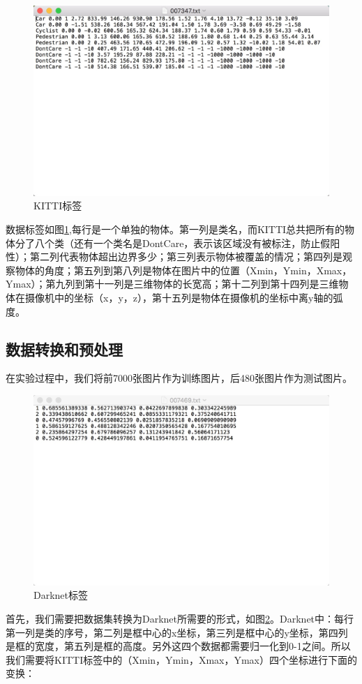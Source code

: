 {	\begin{figure}[htbp]
	\centering
	\includegraphics[width=5in]{images/KITTILable.png}
	\caption{KITTI标签}
	\label{KITTILable}
	\end{figure}
	数据标签如图\ref{KITTILable},每行是一个单独的物体。第一列是类名，而KITTI总共把所有的物体分了八个类（还有一个类名是DontCare，表示该区域没有被标注，防止假阳性）；第二列代表物体超出边界多少；第三列表示物体被覆盖的情况；第四列是观察物体的角度；第五列到第八列是物体在图片中的位置（Xmin，Ymin，Xmax，Ymax）；第九列到第十一列是三维物体的长宽高；第十二列到第十四列是三维物体在摄像机中的坐标（x，y，z），第十五列是物体在摄像机的坐标中离y轴的弧度。

	\subsection{数据转换和预处理}
	在实验过程中，我们将前7000张图片作为训练图片，后480张图片作为测试图片。

	\begin{figure}[htbp]
	\centering
	\includegraphics[width=5in]{images/darknetLabel.png}
	\caption{Darknet标签}
	\label{darknetLabel}
	\end{figure}
	首先，我们需要把数据集转换为Darknet所需要的形式，如图\ref{darknetLabel}。Darknet中：每行第一列是类的序号，第二列是框中心的x坐标，第三列是框中心的y坐标，第四列是框的宽度，第五列是框的高度。另外这四个数据都需要归一化到0-1之间。所以我们需要将KITTI标签中的（Xmin，Ymin，Xmax，Ymax）四个坐标进行下面的变换：

}
